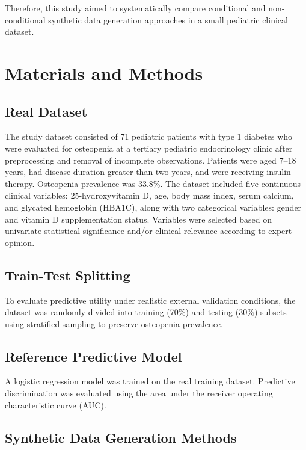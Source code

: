\documentclass[twoside]{article}
\begin{document}
\noindent Therefore, this study aimed to systematically compare conditional and non-conditional synthetic data generation approaches in a small pediatric clinical dataset.

\section{Materials and Methods}

\subsection{Real Dataset}

\noindent \noindent The study dataset consisted of 71 pediatric patients with type 1 diabetes who were evaluated for osteopenia at a tertiary pediatric endocrinology clinic after preprocessing and removal of incomplete observations. Patients were aged 7--18 years, had disease duration greater than two years, and were receiving insulin therapy. Osteopenia prevalence was 33.8\%. The dataset included five continuous clinical variables: 25-hydroxyvitamin D, age, body mass index, serum calcium, and glycated hemoglobin (HBA1C), along with two categorical variables: gender and vitamin D supplementation status. Variables were selected based on univariate statistical significance and/or clinical relevance according to expert opinion.



\subsection{Train-Test Splitting}

\noindent To evaluate predictive utility under realistic external validation conditions, the dataset was randomly divided into training (70\%) and testing (30\%) subsets using stratified sampling to preserve osteopenia prevalence.

\subsection{Reference Predictive Model}

\noindent A logistic regression model was trained on the real training dataset. Predictive discrimination was evaluated using the area under the receiver operating characteristic curve (AUC).

\subsection{Synthetic Data Generation Methods}
\end{document}
